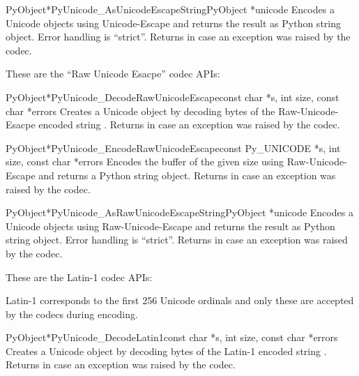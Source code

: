 \documentclass{manual}
\begin{document}
\begin{cfuncdesc}{PyObject*}{PyUnicode_AsUnicodeEscapeString}{PyObject *unicode}
Encodes a Unicode objects using Unicode-Escape and returns the result
as Python string object. Error handling is ``strict''. Returns
\NULL{} in case an exception was raised by the codec.
\end{cfuncdesc}


These are the ``Raw Unicode Esacpe'' codec APIs:

\begin{cfuncdesc}{PyObject*}{PyUnicode_DecodeRawUnicodeEscape}{const char *s,
                                               int size,
                                               const char *errors}
Creates a Unicode object by decoding  bytes of the Raw-Unicode-Esacpe
encoded string . Returns \NULL{} in case an exception was
raised by the codec.
\end{cfuncdesc}

\begin{cfuncdesc}{PyObject*}{PyUnicode_EncodeRawUnicodeEscape}{const Py_UNICODE *s,
                                               int size,
                                               const char *errors}
Encodes the  buffer of the given size using Raw-Unicode-Escape
and returns a Python string object.  Returns \NULL{} in case an
exception was raised by the codec.
\end{cfuncdesc}

\begin{cfuncdesc}{PyObject*}{PyUnicode_AsRawUnicodeEscapeString}{PyObject *unicode}
Encodes a Unicode objects using Raw-Unicode-Escape and returns the result
as Python string object. Error handling is ``strict''. Returns
\NULL{} in case an exception was raised by the codec.
\end{cfuncdesc}


These are the Latin-1 codec APIs:

Latin-1 corresponds to the first 256 Unicode ordinals and only these
are accepted by the codecs during encoding.

\begin{cfuncdesc}{PyObject*}{PyUnicode_DecodeLatin1}{const char *s,
                                                     int size,
                                                     const char *errors}
Creates a Unicode object by decoding  bytes of the Latin-1
encoded string . Returns \NULL{} in case an exception was
raised by the codec.
\end{cfuncdesc}
\end{document}
